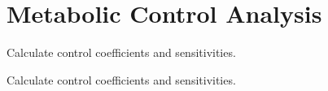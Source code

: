 \hypertarget{group__mca}{
\section{\-Metabolic \-Control \-Analysis}
\label{group__mca}
}


\-Calculate control coefficients and sensitivities.  


\-Calculate control coefficients and sensitivities. 